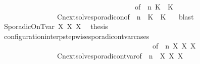 \begin{isabellebody}
\ \ \ \ \ \ \ \ \ \ \ \ \ \ \ \ \ \ \ \ \ \ \ \ \ \ \ \ \ \ \ \ \ \ \ \ \ \ {\isacharbrackleft}of\ {\isacartoucheopen}{\isasymGamma}{\isacartoucheclose}\ {\isacartoucheopen}n{\isacartoucheclose}\ {\isacartoucheopen}K{}{\isacartoucheclose}\ {\isacartoucheopen}{\isasymtau}{\isacartoucheclose}\ {\isacartoucheopen}K{}{\isacartoucheclose}\ {\isacartoucheopen}{\isasymPsi}{\isacartoucheclose}\ {\isacartoucheopen}{\isasymPhi}{\isacartoucheclose}{\isacharbrackright}\isanewline
\ \ \ \ \ \ \ \ \ \ \ \ \ \ \ \ Cnext{\isacharunderscore}solve{\isacharunderscore}sporadicon{\isacharbrackleft}of\ {\isacartoucheopen}{\isasymGamma}{\isacartoucheclose}\ {\isacartoucheopen}n{\isacartoucheclose}\ {\isacartoucheopen}{\isasymPsi}{\isacartoucheclose}\ {\isacartoucheopen}K{}{\isacartoucheclose}\ {\isacartoucheopen}{\isasymtau}{\isacartoucheclose}\ {\isacartoucheopen}K{}{\isacartoucheclose}\ {\isacartoucheopen}{\isasymPhi}{\isacartoucheclose}{\isacharbrackright}\ \isamarkupfalse%
\ blast\isanewline
\ \ \ \ \ \ \isamarkupfalse%
\isanewline
\ \ \ \ \ \ \ \ \isamarkupfalse%
\ {\isacharparenleft}SporadicOnTvar\ X{}\ X{}\ X{}{\isacharparenright}\ \isamarkupfalse%
\ {\isacharquery}thesis\isanewline
\ \ \ \ \ \ \ \ \ \ \isamarkupfalse%
\ configuration{\isacharunderscore}interp{\isacharunderscore}stepwise{\isacharunderscore}sporadicon{\isacharunderscore}tvar{\isacharunderscore}cases\isanewline
\ \ \ \ \ \ \ \ \ \ \ \ \ \ \ \ \ \ \ \ \ \ \ \ \ \ \ \ \ \ \ \ \ \ \ \ \ \ \ \ \ \ \ {\isacharbrackleft}of\ {\isacartoucheopen}{\isasymGamma}{\isacartoucheclose}\ {\isacartoucheopen}n{\isacartoucheclose}\ {\isacartoucheopen}X{}{\isacartoucheclose}\ {\isacartoucheopen}X{}{\isacartoucheclose}\ {\isacartoucheopen}X{}{\isacartoucheclose}\ {\isacartoucheopen}{\isasymPsi}{\isacartoucheclose}\ {\isacartoucheopen}{\isasymPhi}{\isacartoucheclose}{\isacharbrackright}\isanewline
\ \ \ \ \ \ \ \ \ \ \ \ \ \ \ \ Cnext{\isacharunderscore}solve{\isacharunderscore}sporadicon{\isacharunderscore}tvar{\isacharbrackleft}of\ {\isacartoucheopen}{\isasymGamma}{\isacartoucheclose}\ {\isacartoucheopen}n{\isacartoucheclose}\ {\isacartoucheopen}{\isasymPsi}{\isacartoucheclose}\ {\isacartoucheopen}X{}{\isacartoucheclose}\ {\isacartoucheopen}X{}{\isacartoucheclose}\ {\isacartoucheopen}X{}{\isacartoucheclose}\ {\isacartoucheopen}{\isasymPhi}{\isacartoucheclose}{\isacharbrackright}\ \isamarkupfalse%

\end{isabellebody}
